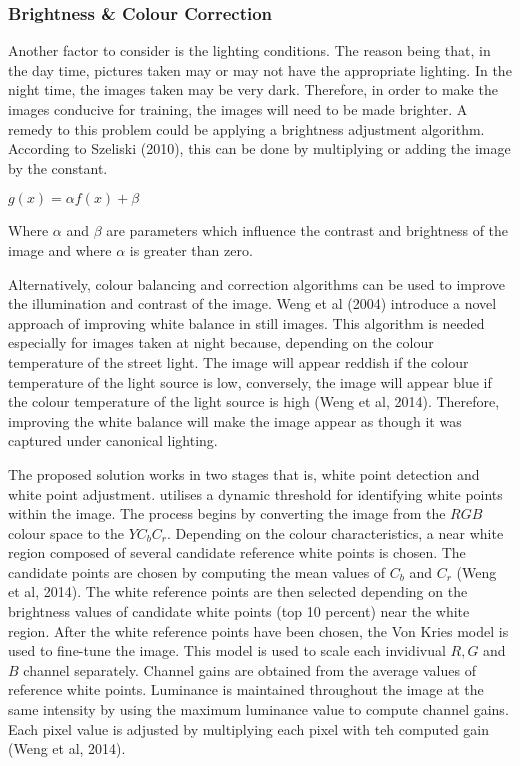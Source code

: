 \documentclass[a4paper, 12pt]{article}
\begin{document}
\subsubsection{ Brightness \& Colour Correction }
Another factor to consider is the lighting conditions. The reason being that, in the day time, pictures taken may or may not have the appropriate lighting. In the night time, the images taken may be very dark. Therefore, in order to make the images conducive for training, the images will need to be made brighter. A remedy to this problem could be applying a brightness adjustment algorithm. According to Szeliski (2010), this can be done by multiplying or adding the image by the constant. 

\begin{center}
 $g(x) = \alpha f(x) + \beta$
\end{center}

Where $\alpha$ and $\beta$ are parameters which influence the contrast and brightness of the image and where $\alpha$ is greater than zero. 

Alternatively, colour balancing and correction algorithms can be used to improve the illumination and contrast of the image. Weng et al (2004) introduce a novel approach of improving white balance in still images. This algorithm is needed especially for images taken at night because, depending on the colour temperature of the street light. The image will appear reddish if the colour temperature of the light source is low, conversely, the image will appear blue if the colour temperature of the light source is high (Weng et al, 2014). Therefore, improving the white balance will make the image appear as though it was captured under canonical lighting. 
\parskip 0.2in

The proposed solution works in two stages that is, white point detection and white point adjustment. utilises a dynamic threshold for identifying white points within the image. The process begins by converting the image from the $RGB$ colour space to the  $YC_{b}C_{r}$. Depending on the colour characteristics, a near white region composed of several candidate reference white points is chosen. The candidate points are chosen by computing the mean values of $C_{b}$ and $C_{r}$ (Weng et al, 2014). The white reference points are then selected depending on the brightness values  of candidate white points (top 10 percent) near the white region. After the white reference points have been chosen, the Von Kries model is used to fine-tune the image. This model is used to scale each invidivual $R, G$ and $B$ channel separately. Channel gains are obtained from the average values of reference white points. Luminance is maintained throughout the image at the same intensity by using the maximum luminance value to compute channel gains. Each pixel value is adjusted by multiplying each pixel with teh computed gain (Weng et al, 2014). 
\end{document}
